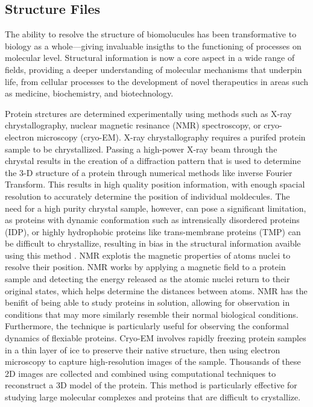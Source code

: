 \subsection{Structure Files}
The ability to resolve the structure of biomolucules has been transformative to biology as a whole---giving invaluable insigths to the functioning of processes on molecular level. Structural information is now a core aspect in a wide range of fields, providing a deeper understanding of molecular mechanisms that underpin life, from cellular processes to the development of novel therapeutics in areas such as medicine, biochemistry, and biotechnology.

Protein strctures are determined experimentally using methods such as X-ray chrystallography, nuclear magnetic resinance (NMR) spectroscopy, or cryo-electron microscopy (cryo-EM). 
X-ray chrystallography requires a purifed protein sample to be chrystallized. Passing a high-power X-ray beam through the chrystal results in the creation of a diffraction pattern that is used to determine the 3-D structure of a protein through numerical methods like inverse Fourier Transform. This results in high quality position information, with enough spacial resolution to accurately determine the position of individual moldecules. The need for a high purity chrystal sample, however, can pose a significant limitation, as proteins with dynamic conformation such as intrensically disordered proteins (IDP), or highly hydrophobic proteins like trans-membrane proteins (TMP) can be difficult to chrystallize, resulting in bias in the structural information avaible using this method \cite{PDB-bias}. 
NMR explotis the magnetic properties of atoms nuclei to resolve their position. NMR works by applying a magnetic field to a protein sample and detecting the energy released as the atomic nuclei return to their original states, which helps determine the distances between atoms. NMR has the benifit of being able to study proteins in solution, allowing for observation in conditions that may more similarly resemble their normal biological conditions. Furthermore, the technique is particularly useful for observing the conformal dynamics of flexiable proteins. 
Cryo-EM involves rapidly freezing protein samples in a thin layer of ice to preserve their native structure, then using  electron microscopy to capture high-resolution images of the sample. Thousands of these 2D images are collected and combined using computational techniques to reconstruct a 3D model of the protein. This method is particularly effective for studying large molecular complexes and proteins that are difficult to crystallize.

